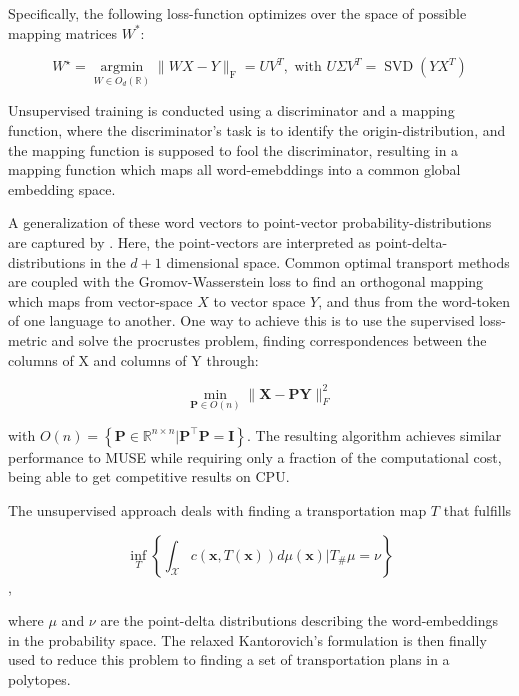 \documentclass[a4paper,12pt,twoside,openright]{report}
\begin{document}
Specifically, the following loss-function optimizes over the space of possible mapping matrices $W^*$:

\begin{equation}
W^{\star}=\underset{W \in O_{d}(\mathbb{R})}{\operatorname{argmin}}\|W X-Y\|_{\mathrm{F}}=U V^{T}, \text { with } U \Sigma V^{T}=\operatorname{SVD}\left(Y X^{T}\right)
\end{equation}

Unsupervised training is conducted using a discriminator and a mapping function, where the discriminator's task is to identify the origin-distribution, and the mapping function is supposed to fool the discriminator, resulting in a mapping function which maps all word-emebddings into a common global embedding space.

A generalization of these word vectors to point-vector probability-distributions are captured by \cite{alvarez18}.
Here, the point-vectors are interpreted as point-delta-distributions in the $d+1$ dimensional space.
Common optimal transport methods are coupled with the Gromov-Wasserstein loss to find an orthogonal mapping which maps from vector-space $X$ to vector space $Y$, and thus from the word-token of one language to another.
One way to achieve this is to use the supervised loss-metric and solve the procrustes problem, finding correspondences between the columns of X and columns of Y through:

\begin{equation}
\min _{\mathbf{P} \in O(n)}\|\mathbf{X}-\mathbf{P} \mathbf{Y}\|_{F}^{2}
\end{equation}

with $O(n)=\left\{\mathbf{P} \in \mathbb{R}^{n \times n} | \mathbf{P}^{\top} \mathbf{P}=\mathbf{I}\right\}$.
The resulting algorithm achieves similar performance to MUSE while requiring only a fraction of the computational cost, being able to get competitive results on CPU.

The unsupervised approach deals with finding a transportation map $T$ that fulfills

\begin{equation}
\inf _{T}\left\{\int_{\mathcal{X}} c(\mathbf{x}, T(\mathbf{x})) d \mu(\mathbf{x}) | T_{\#} \mu=\nu\right\}
\end{equation},

where $\mu$ and $\nu$ are the point-delta distributions describing the word-embeddings in the probability space.
The relaxed Kantorovich's formulation is then finally used to reduce this problem to finding a set of transportation plans in a polytopes.
\end{document}
